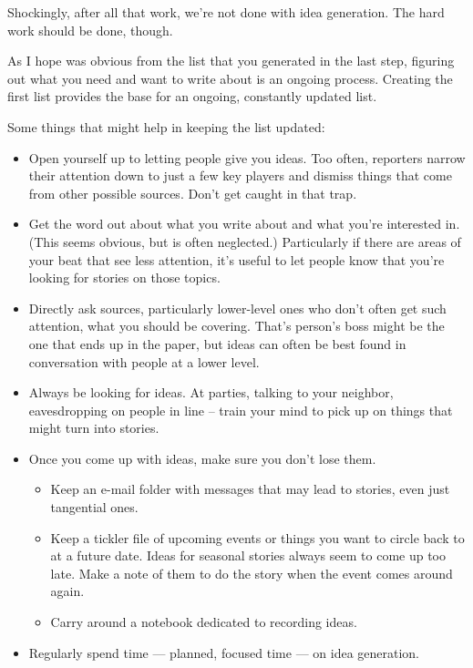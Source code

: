 \documentclass[
  12pt,
  american,
  letterpaperpaper,
  extrafontsizes,onecolumn,openright
  ]{memoir}
\providecommand{\tightlist}{%
  \setlength{\itemsep}{0pt}\setlength{\parskip}{0pt}}
\begin{document}
Shockingly, after all that work, we're not done with idea generation. The hard work should be done, though.

As I hope was obvious from the list that you generated in the last step, figuring out what you need and want to write about is an ongoing process. Creating the first list provides the base for an ongoing, constantly updated list.

Some things that might help in keeping the list updated:

\begin{itemize}
\tightlist
\item
  Open yourself up to letting people give you ideas. Too often, reporters narrow their attention down to just a few key players and dismiss things that come from other possible sources. Don't get caught in that trap.
\item
  Get the word out about what you write about and what you're interested in. (This seems obvious, but is often neglected.) Particularly if there are areas of your beat that see less attention, it's useful to let people know that you're looking for stories on those topics.
\item
  Directly ask sources, particularly lower-level ones who don't often get such attention, what you should be covering. That's person's boss might be the one that ends up in the paper, but ideas can often be best found in conversation with people at a lower level.
\item
  Always be looking for ideas. At parties, talking to your neighbor, eavesdropping on people in line -- train your mind to pick up on things that might turn into stories.
\item
  Once you come up with ideas, make sure you don't lose them.

  \begin{itemize}
  \tightlist
  \item
    Keep an e-mail folder with messages that may lead to stories, even just tangential ones.
  \item
    Keep a tickler file of upcoming events or things you want to circle back to at a future date. Ideas for seasonal stories always seem to come up too late. Make a note of them to do the story when the event comes around again.
  \item
    Carry around a notebook dedicated to recording ideas.
  \end{itemize}
\item
  Regularly spend time --- planned, focused time --- on idea generation.


\end{itemize}
\end{document}

